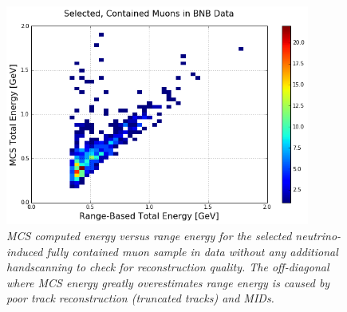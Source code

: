 \begin{figure}[h!]
\begin{center}
\includegraphics[width=100mm]{Figures/MCS_range_comparison_DataRecoTracks_nohandscan.png}
\end{center}
\caption{\textit{MCS computed energy versus range energy for the selected neutrino-induced fully contained muon sample in data without any additional handscanning to check for reconstruction quality. The off-diagonal where MCS energy greatly overestimates range energy is caused by poor track reconstruction (truncated tracks) and MIDs.}}
\label{MCS_range_energy_DataRecoTrack_nohandscan_fig}
\end{figure}


